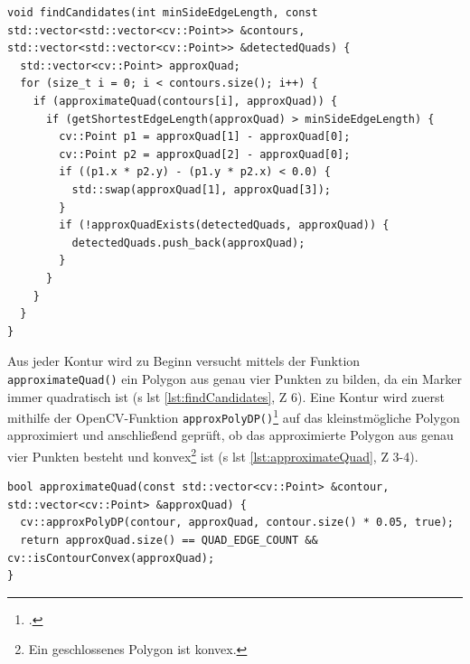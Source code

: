 \begin{lstlisting}[caption={Die Funktion \texttt{detectormarkerbased.cpp/findCandidates();} evaluiert, ob die übergebenen Konturen grundsätzlich einen Marker darstellen könnten}, label={lst:findCandidates}]
void findCandidates(int minSideEdgeLength, const std::vector<std::vector<cv::Point>> &contours, std::vector<std::vector<cv::Point>> &detectedQuads) {
  std::vector<cv::Point> approxQuad;
  for (size_t i = 0; i < contours.size(); i++) {
    if (approximateQuad(contours[i], approxQuad)) {
      if (getShortestEdgeLength(approxQuad) > minSideEdgeLength) {
        cv::Point p1 = approxQuad[1] - approxQuad[0];
        cv::Point p2 = approxQuad[2] - approxQuad[0];
        if ((p1.x * p2.y) - (p1.y * p2.x) < 0.0) {
          std::swap(approxQuad[1], approxQuad[3]);
        }
        if (!approxQuadExists(detectedQuads, approxQuad)) {
          detectedQuads.push_back(approxQuad);
        }
      }
    }
  }
}
\end{lstlisting}

\noindent Aus jeder Kontur wird zu Beginn versucht mittels der Funktion \texttt{approximateQuad()} ein Polygon aus genau vier Punkten zu bilden, da ein Marker immer quadratisch ist (\acs{s} \acs{lst} \ref{lst:findCandidates}, \acs{Z} 6). Eine Kontur wird zuerst mithilfe der OpenCV-Funktion \texttt{approxPolyDP()}\footcite{opencvapproxPolyDP} auf das kleinstmögliche Polygon approximiert und anschließend geprüft, ob das approximierte Polygon aus genau vier Punkten besteht und konvex\footnote{Ein geschlossenes Polygon ist konvex.} ist (\acs{s} \acs{lst} \ref{lst:approximateQuad}, \acs{Z} 3-4).

\newpage

\begin{lstlisting}[caption={Die Funktion \texttt{detectormarkerbased.cpp/approximateQuad();} approximiert aus einer gegeben Kontur ein Quadrat \acs{bzw} ein konvexes Polygon aus genau vier Punkten darstellt}, label={lst:approximateQuad}]
bool approximateQuad(const std::vector<cv::Point> &contour, std::vector<cv::Point> &approxQuad) {
  cv::approxPolyDP(contour, approxQuad, contour.size() * 0.05, true);
  return approxQuad.size() == QUAD_EDGE_COUNT && cv::isContourConvex(approxQuad);
}
\end{lstlisting}

